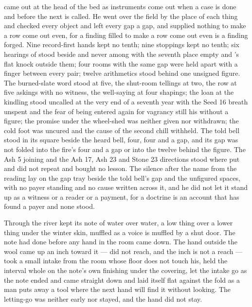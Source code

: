  came out at the head of the bed as instruments come out when a case is done and before the next is called. He went over the field by the place of each thing and checked every object and left every gap a gap, and supplied nothing to make a row come out even, for a finding filled to make a row come out even is a finding forged. Nine record-first hands kept no tenth; nine stoppings kept no tenth; six hearings of  stood beside and never among with the seventh place empty and 's flat knock outside them; four rooms with the same gap were held apart with a finger between every pair; twelve arithmetics stood behind one unsigned figure. The burned-slate word stood at five, the shut-room tellings at two, the row at five askings with no witness, the well-saying at four shapings; the loan at the kindling stood uncalled at the very end of a seventh year with the Seed 16 breath unspent and the fear of being entered again for vagrancy still his without a figure; the promise under the wheel-shed was neither given nor withdrawn; the cold foot was uncured and the cause of the second chill withheld. The told bell stood in its square beside the heard bell, four, four and a gap, and its gap was not folded into the fire's four and a gap or into the twelve behind the figure. The Ash 5 joining and the Ash 17, Ash 23 and Stone 23 directions stood where put and did not repeat and bought no lesson. The silence after the name from the reading lay on the gap tray beside the told bell's gap and the unfigured spaces, with no payer standing and no cause written across it, and he did not let it stand up as a witness or a reader or a payment, for a doctrine is an account that has found a payer and none stood.

Through  the river kept its note of water over water, a low thing over a lower thing under the winter skin, muffled as a voice is muffled by a shut door. The note had done before any hand in the room came down. The hand outside the wool came up an inch toward it --- did not reach, and the inch is not a reach --- took a small intake from the room whose floor does not touch his, held the interval whole on the note's own finishing under the covering, let the intake go as the note ended and came straight down and laid itself flat against the fold as a man puts away a tool where the next hand will find it without looking. The letting-go was neither early nor stayed, and the hand did not stay.


